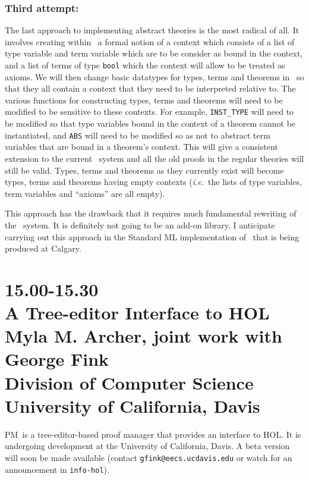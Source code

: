 \subsubsection*{Third attempt:}
The last approach to implementing abstract theories is the most radical
of all.  It involves creating within \HOL\ a formal notion of a
context which consists of a list of type variable and term variable
which are to be consider as bound in the context, and a list of terms
of type {\tt bool} which the context will allow to be treated as
axioms.  We will then change basic datatypes for types, terms and
theorems in \HOL\ so that they all contain a context that they need to
be interpreted relative to.  The various functions for constructing
types, terms and theorems will need to be modified to be sensitive to
these contexts.  For example, {\tt INST\_TYPE} will need to be
modified so that type variables bound in the context of a theorem
cannot be instantiated, and {\tt ABS} will need to be modified so as
not to abstract term variables that are bound in a theorem's context.
This will give a consistent extension to the current \HOL\ system and
all the old proofs in the regular theories will still be valid.
Types, terms and theorems as they currently exist will become types,
terms and theorems having empty contexts ({\it i.e.}~the lists of type
variables, term variables and ``axioms'' are all empty).

This approach has the drawback that it requires much fundamental
rewriting of the \HOL\ system.  It is definitely not going to be an
add-on library.  I anticipate carrying out this approach in the
Standard ML implementation of \HOL\ that is being produced at Calgary.


\newpage
\section*{15.00-15.30\\
A Tree-editor Interface to HOL\\
Myla M. Archer, joint work with George Fink\\
\large\bf Division of Computer Science\\
\large\bf University of California, Davis}

\def\PM{{\small PM}}
\def\HOL{{\small HOL}}

     \PM\ is a tree-editor-based proof manager that provides an interface to
\HOL.  It is undergoing development at the University of California, Davis.
A beta version will soon be made available (contact
 {\tt gfink@eecs.ucdavis.edu}
or watch for an announcement in {\tt info-hol}).

